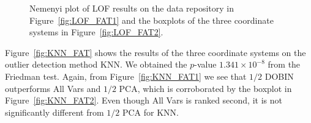 \documentclass[a4paper,11pt]{article}
\begin{document}
\begin{figure}[!ht]
	\centering
	\hfill
	\caption{Nemenyi plot of LOF results on the data repository in Figure~\ref{fig:LOF_FAT1} and the boxplots of the three coordinate systems in Figure~\ref{fig:LOF_FAT2}.}
	\label{fig:LOF_FAT}
\end{figure}

Figure~\ref{fig:KNN_FAT} shows the results of the three coordinate systems on the outlier detection method KNN. We obtained the $p$-value $1.341\times 10^{-8}$ from the Friedman test. Again, from Figure~\ref{fig:KNN_FAT1} we see that $1/2$ DOBIN outperforms All Vars and $1/2$ PCA, which is corroborated by the boxplot in Figure~\ref{fig:KNN_FAT2}. Even though All Vars is ranked second, it is not significantly different from $1/2$ PCA for KNN.
\end{document}
